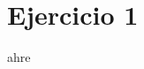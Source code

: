\documentclass[../../e3_tp2_main.tex]{subfiles}
\begin{document}
\chapter{Ejercicio 1}

ahre
\end{document}
